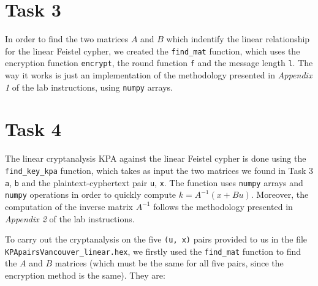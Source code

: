 \documentclass{report}
\begin{document}
\section*{Task 3}
In order to find the two matrices $A$ and $B$ which indentify the linear relationship for the linear Feistel cypher, we created the {\tt find\_mat} function, which uses the encryption function {\tt encrypt}, the round function {\tt f} and the message length {\tt l}. The way it works is just an implementation of the methodology presented in \textit{Appendix 1} of the lab instructions, using {\tt numpy} arrays.

\section*{Task 4}
The linear cryptanalysis KPA against the linear Feistel cypher is done using the {\tt find\_key\_kpa} function, which takes as input the two matrices we found in Task 3 {\tt a}, {\tt b} and the plaintext-cyphertext pair {\tt u}, {\tt x}. The function uses {\tt numpy} arrays and {\tt numpy} operations in order to quickly compute $k = A^{-1}(x + Bu)$. Moreover, the computation of the inverse matrix $A^{-1}$ follows the methodology presented in \textit{Appendix 2} of the lab instructions.

To carry out the cryptanalysis on the five {\tt (u, x)} pairs provided to us in the file {\tt KPApairsVancouver\_linear.hex}, we firstly used the {\tt find\_mat} function to find the $A$ and $B$ matrices (which must be the same for all five pairs, since the encryption method is the same). They are:
\end{document}

